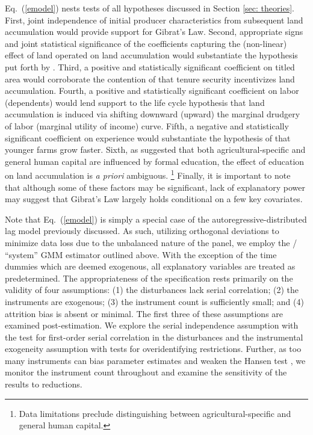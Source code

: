 \documentclass[english]{article}
\begin{document}
Eq.\ (\ref{emodel}) nests tests of all hypotheses discussed in Section 
\ref{sec: theories}. 
First, joint independence of initial producer characteristics from 
subsequent land accumulation would provide support for Gibrat's Law.
Second, appropriate signs and joint statistical significance of the coefficients 
capturing the (non-linear) effect of land operated on land accumulation 
would substantiate the hypothesis put forth by \citet{carter1993}.
Third, a positive and statistically significant coefficient on titled area would 
corroborate the contention of \citet{carter1998b} that tenure security 
incentivizes land accumulation.
Fourth, a positive and statistically significant coefficient on labor 
(dependents) would lend support to the life cycle hypothesis that land 
accumulation is induced via shifting downward (upward) the marginal 
drudgery of labor (marginal utility of income) curve.
Fifth, a negative and statistically significant coefficient on experience 
would substantiate the hypothesis of \citet{jovanovic1982} that younger 
farms grow faster. 
Sixth, as \citet{rodgers1994} suggested that both agricultural-specific and
general human capital are influenced by formal education, the effect of 
education on land accumulation is \emph{a priori} ambiguous.%
\footnote{Data limitations preclude distinguishing between 
agricultural-specific and general human capital.}
Finally, it is important to note that although some of these factors may be 
significant, lack of explanatory power may suggest that Gibrat's Law largely 
holds conditional on a few key covariates.

Note that Eq.\ (\ref{emodel}) is simply a special case of the 
autoregressive-distributed lag model previously discussed. 
As such, utilizing orthogonal deviations to minimize data loss due to the 
unbalanced nature of the panel, we employ the 
\citet{arellano1995}/\citet{blundell1998} ``system'' GMM estimator 
outlined above. 
With the exception of the time dummies which are deemed exogenous, all 
explanatory variables are treated as predetermined. 
The appropriateness of the specification rests primarily on the validity of 
four assumptions: (1) the disturbances lack serial correlation; (2) the 
instruments are exogenous; (3) the instrument count is sufficiently small; 
and (4) attrition bias is absent or minimal. 
The first three of these assumptions are examined post-estimation.
We explore the serial independence assumption with the \citet{arellano1991} 
test for first-order serial correlation in the disturbances and the instrumental 
exogeneity assumption with \citet{hansen1982} tests for overidentifying 
restrictions. 
Further, as too many instruments can bias parameter estimates and weaken 
the Hansen test \citep{roodman2009b}, we monitor the instrument count 
throughout and examine the sensitivity of the results to reductions.
\end{document}
